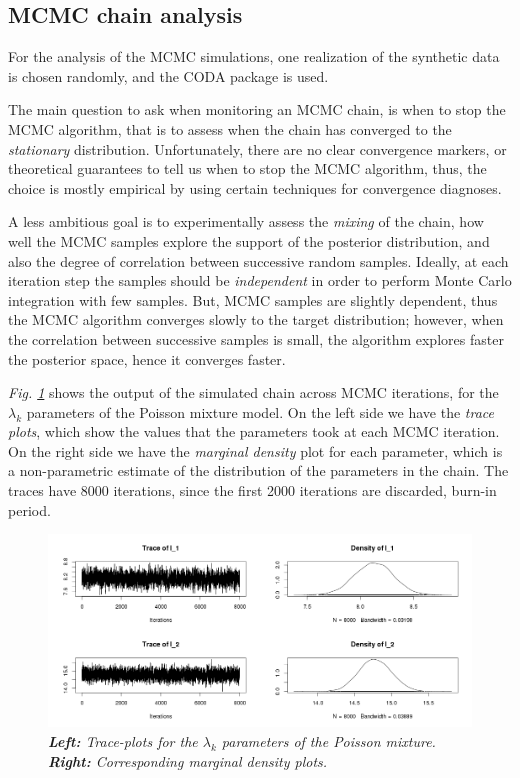 \subsection{MCMC chain analysis} \label{integr-synth-chain-sect}
For the analysis of the MCMC simulations, one realization of the synthetic data is chosen randomly, and the CODA package \citep{Plummer2006} is used. 

The main question to ask when monitoring an MCMC chain, is when to stop the MCMC algorithm, that is to assess when the chain has converged to the \emph{stationary} distribution. Unfortunately, there are no clear convergence markers, or theoretical guarantees to tell us when to stop the MCMC algorithm, thus, the choice is mostly empirical by using certain techniques for convergence diagnoses.

A less ambitious goal is to experimentally assess the \emph{mixing} of the chain, \ie how well the MCMC samples explore the support of the posterior distribution, and also the degree of correlation between successive random samples. Ideally, at each iteration step the samples should be \emph{independent} in order to perform Monte Carlo integration with few samples. But, MCMC samples are slightly dependent, thus the MCMC algorithm converges slowly to the target distribution; however, when the correlation between successive samples is small, the algorithm explores faster the posterior space, hence it converges faster.

\emph{Fig. \ref{trace-density-l-pic}} shows the output of the simulated chain across MCMC iterations, for the $\lambda_{k}$ parameters of the Poisson mixture model. On the left side we have the \emph{trace plots}, which show the values that the parameters took at each MCMC iteration. On the right side we have the \emph{marginal density} plot for each parameter, which is a non-parametric estimate of the distribution of the parameters in the chain. The traces have 8000 iterations, since the first 2000 iterations are discarded, \ie burn-in period.
\begin{figure}[!ht]
\begin{center}
 \includegraphics[scale = 0.40]{images/traceDensityL.png}
\caption{\emph{\textbf{Left:} Trace-plots for the $\lambda_{k}$ parameters of the Poisson mixture. \textbf{Right:} Corresponding marginal density plots.}}
\label{trace-density-l-pic}
\end{center}
\end{figure}

